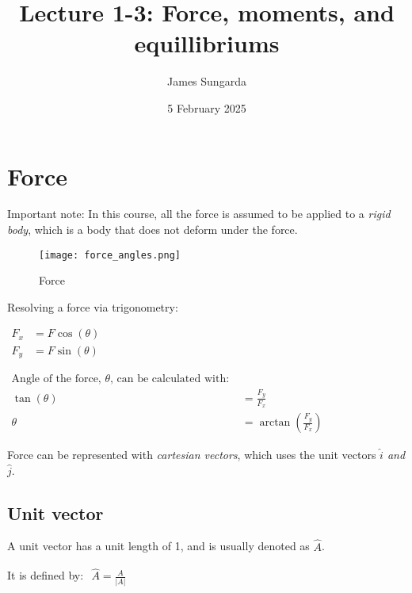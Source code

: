 \documentclass{scrartcl}
\title{Lecture 1-3: Force, moments, and equillibriums}
\author{James Sungarda}
\date{5 February 2025}
\begin{document}
\maketitle

\section{Force}

Important note: In this course, all the force is assumed to be applied to a \emph{rigid body},
which is a body that does not deform under the force.

\begin{figure}[h]
    \centering
    \texttt{[image: force\_angles.png]}
    \caption{Force}
\end{figure}

Resolving a force via trigonometry:

\begin{math}
    \begin{aligned}
        F_x &= F \cos(\theta) \\
        F_y &= F \sin(\theta)
    \end{aligned}
\end{math}

\begin{math}
    \begin{aligned}
        \text{Angle of the force, } \theta\text{, can be calculated with:  }\\
        \tan(\theta) &= \frac{F_y}{F_x} \\
        \theta &= \arctan(\frac{F_y}{F_x})
    \end{aligned}
\end{math}

Force can be represented with \emph{cartesian vectors}, which uses the unit vectors \emph{\(\hat{i}\) and \(\hat{j}\)}.

\subsection{Unit vector}
A unit vector has a unit length of 1, and is usually denoted as $\hat{A}$.

It is defined by:
\begin{math}
    \begin{aligned}
        \hat{A} = \frac{A}{|A|}
    \end{aligned}
\end{math}
\end{document}
